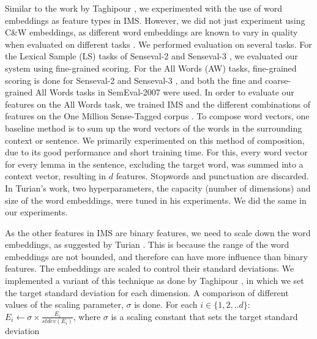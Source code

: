 Similar to the work by Taghipour , we experimented with the use of word embeddings as feature types in IMS. However, we did not just experiment using C\&W embeddings, as different word embeddings are known to vary in quality when evaluated on different tasks \cite{schnabel2015evaluation}. We performed evaluation on several tasks. For the Lexical Sample (LS) tasks of Senseval-2 \cite{senseval2-LS-kilgarriff2001} and Senseval-3 \cite{senseval3-LS-mihalcea2004}, we evaluated our system using fine-grained scoring. For the All Words (AW) tasks, fine-grained scoring is done for Senseval-2 \cite{senseval2-AW-palmer2001} and Senseval-3 \cite{senseval3-AW-snyder2004}, and both the fine \cite{semeval2007-fine-pradhan2007} and coarse-grained \cite{semeval2007-coarse-navigli2007} All Words tasks in SemEval-2007 were used. In order to evaluate our features on the All Words task, we trained IMS and the different combinations of features on the One Million Sense-Tagged corpus \cite{taghipour2015one}.
To compose word vectors, one baseline method is to sum up the word vectors of the words in the surrounding context or sentence. We primarily experimented on this method of composition, due to its good performance and short training time. For this, every word vector for every lemma in the sentence, excluding the target word, was summed into a context vector, resulting in $d$ features. Stopwords and punctuation are discarded. In Turian's  work, two hyperparameters, the capacity (number of dimensions) and size of the word embeddings, were tuned in his experiments. We did the same in our experiments.

As the other features in IMS are binary features, we need to scale down the word embeddings, as suggested by Turian . This is because the range of the word embeddings are not bounded, and therefore can have more influence than binary features. The embeddings are scaled to control their standard deviations. We implemented a variant of this technique as done by Taghipour , in which we set the target standard deviation for each dimension. A comparison of different values of the scaling parameter, $\sigma$ is done. For each $i \in \{1, 2, .. d\}$:
\\

$E_{i} \leftarrow \sigma \times \frac{E_{i}}{stdev(E_{i})} $, where $\sigma$ is a scaling constant that sets the target standard deviation
\\ 

